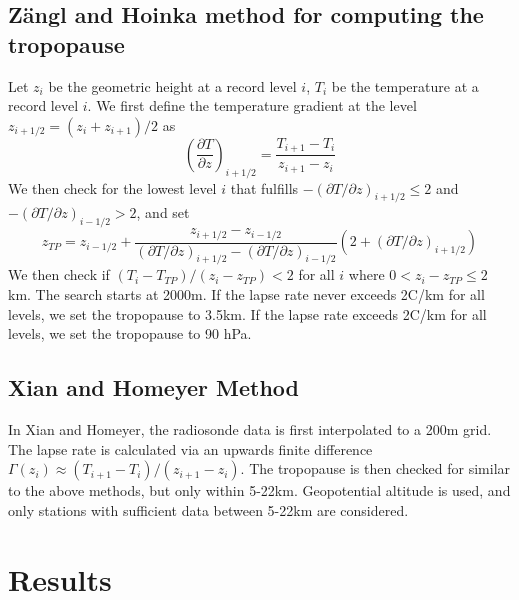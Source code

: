 \documentclass[fleqn,10pt]{wlscirep}
\begin{document}
\subsection*{Z\"{a}ngl and Hoinka method for computing the tropopause\cite{zangl2001tropopause}}
Let $z_{i}$ be the geometric height at a record level $i$, $T_i$ be the temperature at a record level $i$. We first define the temperature gradient at the level $z_{i+1/2} = (z_i + z_{i+1})/2$ as 
\[\left(\frac{\partial T}{\partial z}\right)_{i+1/2} = \frac{T_{i+1} - T_i}{z_{i+1} - z_i}\]
We then check for the lowest level $i$ that fulfills $-(\partial T/\partial z)_{i + 1/2} \leq 2$ and $-(\partial T/\partial z)_{i - 1/2} > 2$, and set 
\[z_{TP} = z_{i-1/2} + \frac{z_{i+1/2} - z_{i-1/2}}{(\partial T/\partial z)_{i+1/2} - (\partial T/\partial z)_{i-1/2}}(2 + (\partial T/\partial z)_{i+1/2})\]
We then check if $(T_i - T_{TP})/(z_i - z_{TP}) < 2$ for all $i$ where $0 < z_i - z_{TP} \leq 2$ km. The search starts at 2000m. If the lapse rate never exceeds 2\textdegree C/km for all levels, we set the tropopause to 3.5km. If the lapse rate exceeds 2\textdegree C/km for all levels, we set the tropopause to 90 hPa. 
\subsection*{Xian and Homeyer Method\cite{xian2019global}}
In Xian and Homeyer, the radiosonde data is first interpolated to a 200m grid. The lapse rate is calculated via an upwards finite difference $\Gamma(z_i) \approx (T_{i+1} - T_i)/(z_{i+1} - z_i)$. The tropopause is then checked for similar to the above methods, but only within 5-22km. Geopotential altitude is used, and only stations with sufficient data between 5-22km are considered. 


















\newpage 
\newpage 

\section*{Results}
\end{document}
